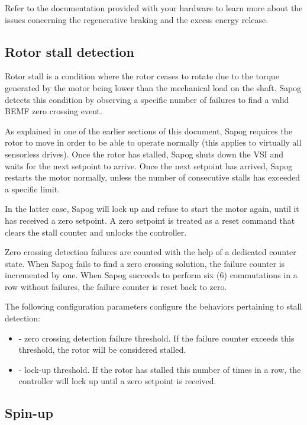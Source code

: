 \documentclass{zubaxdoc}
\begin{document}
Refer to the documentation provided with your hardware to learn more about the issues
concerning the regenerative braking and the excess energy release.

\subsection{Rotor stall detection}\label{sec:stall_detection}

Rotor stall is a condition where the rotor ceases to rotate due to the torque generated by the motor
being lower than the mechanical load on the shaft.
Sapog detects this condition by observing a specific number of failures to find
a valid BEMF zero crossing event.

As explained in one of the earlier sections of this document,
Sapog requires the rotor to move in order to be able to operate normally
(this applies to virtually all sensorless drives).
Once the rotor has stalled, Sapog shuts down the VSI and waits for the next setpoint to arrive.
Once the next setpoint has arrived, Sapog restarts the motor normally,
unless the number of consecutive stalls has exceeded a specific limit.

In the latter case, Sapog will lock up and refuse to start the motor again,
until it has received a zero setpoint.
A zero setpoint is treated as a reset command that clears the stall counter and unlocks the controller.

Zero crossing detection failures are counted with the help of a dedicated counter state.
When Sapog fails to find a zero crossing solution,
the failure counter is incremented by one.
When Sapog succeeds to perform six (6) commutations in a row without failures,
the failure counter is reset back to zero.

The following configuration parameters configure the behaviors pertaining to stall detection:

\begin{itemize}
\item {} - zero crossing detection failure threshold.
If the failure counter exceeds this threshold, the rotor will be considered stalled.
\item {} - lock-up threshold.
If the rotor has stalled this number of times in a row,
the controller will lock up until a zero setpoint is received.
\end{itemize}

\subsection{Spin-up}
\end{document}

